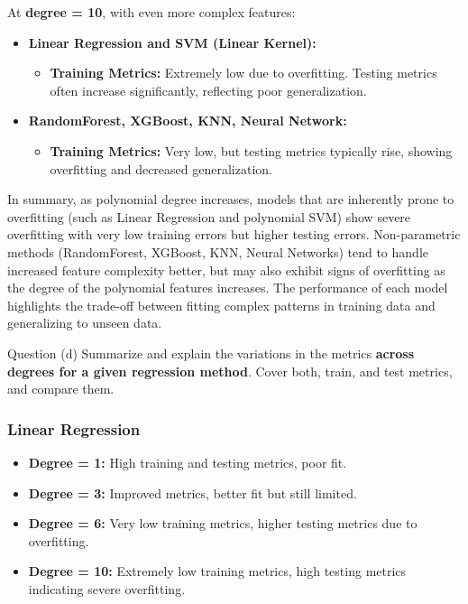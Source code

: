 At \textbf{degree = 10}, with even more complex features:

\begin{itemize}
    \item \textbf{Linear Regression and SVM (Linear Kernel):} 
    \begin{itemize}
        \item \textbf{Training Metrics:} Extremely low due to overfitting. Testing metrics often increase significantly, reflecting poor generalization.
    \end{itemize}
    
    \item \textbf{RandomForest, XGBoost, KNN, Neural Network:}
    \begin{itemize}
        \item \textbf{Training Metrics:} Very low, but testing metrics typically rise, showing overfitting and decreased generalization.
    \end{itemize}
\end{itemize}

In summary, as polynomial degree increases, models that are inherently prone to overfitting (such as Linear Regression and polynomial SVM) show severe overfitting with very low training errors but higher testing errors. Non-parametric methods (RandomForest, XGBoost, KNN, Neural Networks) tend to handle increased feature complexity better, but may also exhibit signs of overfitting as the degree of the polynomial features increases. The performance of each model highlights the trade-off between fitting complex patterns in training data and generalizing to unseen data.

\clearpage

\begin{customboxnew}[label={box:Q3d}]{Question (d)}
	Summarize and explain the variations in the metrics \textbf{across degrees for a given regression method}. Cover both, train, and test metrics, and compare them.
\end{customboxnew}

\subsubsection*{Linear Regression}

\begin{itemize}
    \item \textbf{Degree = 1:} High training and testing metrics, poor fit.
    \item \textbf{Degree = 3:} Improved metrics, better fit but still limited.
    \item \textbf{Degree = 6:} Very low training metrics, higher testing metrics due to overfitting.
    \item \textbf{Degree = 10:} Extremely low training metrics, high testing metrics indicating severe overfitting.
\end{itemize}

